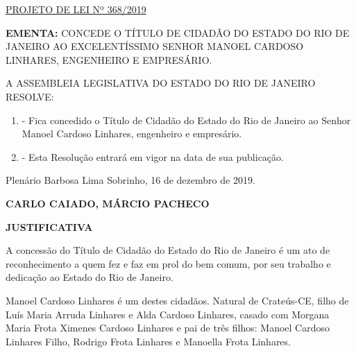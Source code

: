 \documentclass[10pt]{article}
\date{}
\begin{document}
\maketitle
\begin{center}
  \huge
  \vspace{-3cm}\href{http://alerjln1.alerj.rj.gov.br/scpro1923.nsf/9665df2600e114f703256caa00231316/a2f84c94d7f081bd032584d200686e0b?OpenDocument}{PROJETO DE LEI Nº 368/2019}
\bigskip
\bigskip
\bigskip
  
\end{center}

\textbf{EMENTA:} 
CONCEDE O TÍTULO DE CIDADÃO DO ESTADO DO RIO DE JANEIRO AO EXCELENTÍSSIMO SENHOR MANOEL CARDOSO LINHARES, ENGENHEIRO E EMPRESÁRIO.








\bigskip

\noindent
A ASSEMBLEIA LEGISLATIVA DO ESTADO DO RIO DE JANEIRO RESOLVE:

\begin{enumerate}[label=Art. \arabic*\textdegree]
\item - Fica concedido o Título de Cidadão do Estado do Rio de Janeiro ao Senhor Manoel Cardoso Linhares, engenheiro e empresário.

\item - Esta Resolução entrará em vigor na data de sua publicação.

\end{enumerate}




\begin{center}
  Plenário Barbosa Lima Sobrinho, 16 de dezembro de 2019.

   \bigskip

  \textbf{ CARLO CAIADO, MÁRCIO PACHECO}

  \bigskip

  \textbf{JUSTIFICATIVA}
  \bigskip

\end{center}

  
	A concessão do Título de Cidadão do Estado do Rio de Janeiro é um ato de reconhecimento a quem fez e faz em prol do bem comum, por seu trabalho e dedicação ao Estado do Rio de Janeiro.

	Manoel Cardoso Linhares é um destes cidadãos. Natural de Crateús-CE, filho de Luís Maria Arruda Linhares e Alda Cardoso Linhares, casado com Morgana Maria Frota Ximenes Cardoso Linhares e pai de três filhos: Manoel Cardoso Linhares Filho, Rodrigo Frota Linhares e Manoella Frota Linhares.
\end{document}
